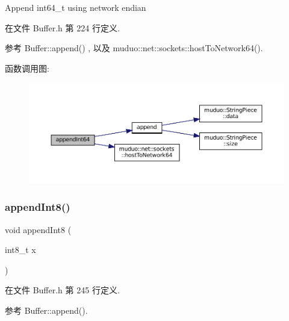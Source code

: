 Append int64\+\_\+t using network endian 

在文件 Buffer.\+h 第 224 行定义.



参考 Buffer\+::append() , 以及 muduo\+::net\+::sockets\+::host\+To\+Network64().

函数调用图\+:
\nopagebreak
\begin{figure}[H]
\begin{center}
\leavevmode
\includegraphics[width=350pt]{classmuduo_1_1net_1_1Buffer_a7e283b380d5c67b86e150324bbb0546a_cgraph}
\end{center}
\end{figure}
\mbox{\label{classmuduo_1_1net_1_1Buffer_a9dca0171bcc73c002095487c464bad28}} 
\subsubsection{\texorpdfstring{append\+Int8()}{appendInt8()}}
{\footnotesize\ttfamily void append\+Int8 (\begin{DoxyParamCaption}\item[{int8\+\_\+t}]{x }\end{DoxyParamCaption})\hspace{0.3cm}{\ttfamily [inline]}}



在文件 Buffer.\+h 第 245 行定义.



参考 Buffer\+::append().

